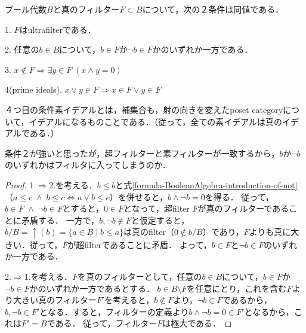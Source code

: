 \documentclass[uplatex, 12pt, dvipdfmx]{jsarticle}
\begin{document}
\begin{proposition*}[ブール代数上のultrafilterの同値な条件]
    ブール代数$B$と真のフィルター$F\subset B$について，次の２条件は同値である．

    1. $F$はultrafilterである．

    2. 任意の$b\in B$について，$b\in F$か$\lnot b\in F$かのいずれか一方である．

    3. $x\notin F\Rightarrow \exists y\in F\; (x\land y=0)$

    4(prime ideals). $x\lor y\in F \Rightarrow x\in F \lor y\in F$
\end{proposition*}
\begin{remark*}
    ４つ目の条件素イデアルとは，補集合も，射の向きを変えたposet categoryについて，イデアルになるものことである．（従って，全ての素イデアルは真のイデアルである．）

    条件２が強いと思ったが，超フィルターと素フィルターが一致するから，$b$か$\lnot b$のいずれかはフィルタに入ってしまうのか．
\end{remark*}
\begin{proof}
    1.$\Rightarrow$2.を考える．$b\le b$と式\ref{formula-BooleanAlgebra-introduction-of-not}（$a\le c\;\land\; b\le c\Leftrightarrow a\lor b\le c$）を併せると，$b\land\lnot b=0$を得る．
    従って，$b\in F\;\land\; \lnot b\in F$とすると，$0\in F$となって，超filter $F$が真のフィルターであることに矛盾する．
    一方で，$b,\lnot b\notin F$と仮定すると，$b/B=\uparrow (b)=\{a\in B\mid b\le a\}$は真のfilter（$0\notin b/B$）であり，$F$よりも真に大きい．従って，$F$が超filterであることに矛盾．
    よって，$b\in F$と$\lnot b\in F$のいずれか一方である．
    
    2.$\Rightarrow$1.を考える．$F$を真のフィルターとして，任意の$b\in B$について，$b\in F$か$\lnot b\in F$かのいずれか一方であるとする．
    $b\in B\setminus F$を任意にとり，これを含む$F$より大きい真のフィルター$F'$を考えると，$b\notin F$より，$\lnot b\in F$であるから，$b,\lnot b\in F'$となる．すると，フィルターの定義より$b\land \lnot b=0\in F'$となるから，これは$F'=B$である．
    従って，フィルター$F$は極大である．
\end{proof}
\end{document}
